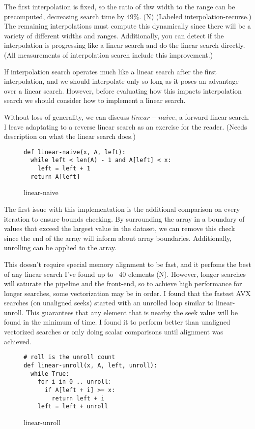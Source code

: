 \documentclass{article}
\begin{document}
The first interpolation is fixed, so the ratio of thw width to the range can be precomputed, decreasing search time by 49\%. (N) (Labeled interpolation-recurse.) The remaining interpolations must compute this dynamically since there will be a variety of different widths and ranges. Additionally, you can detect if the interpolation is progressing like a linear search and do the linear search directly. (All measurements of interpolation search include this improvement.)

If interpolation search operates much like a linear search after the first interpolation, and we should interpolate only so long as it poses an advantage over a linear search. However, before evaluating how this impacts interpolation search we should consider how to implement a linear search.

Without loss of generality, we can discuss $linear-naive$, a forward linear search. I leave adaptating to a reverse linear search as an exercise for the reader. (Needs description on what the linear search does.)

\begin{figure}
\begin{verbatim}
def linear-naive(x, A, left):
  while left < len(A) - 1 and A[left] < x:
    left = left + 1
  return A[left]
\end{verbatim}
\caption{linear-naive}
\end{figure}

 The first issue with this implementation is the additional comparison on every iteration to ensure bounds checking. By surrounding the array in a boundary of values that exceed the largest value in the dataset, we can remove this check since the end of the array will inform about array boundaries. Additionally, unrolling can be applied to the array.

This doesn't require special memory alignment to be fast, and it perfoms the best of any linear search I've found up to ~40 elements (N). However, longer searches will saturate the pipeline and the front-end, so to achieve high performance for longer searches, some vectorization may be in order. I found that the fastest AVX searches (on unaligned seeks) started with an unrolled loop similar to linear-unroll. This guarantees that any element that is nearby the seek value will be found in the minimum of time. I found it to perform better than unaligned vectorized searches or only doing scalar comparisons until alignment was achieved.

\begin{figure}
\begin{verbatim}
# roll is the unroll count
def linear-unroll(x, A, left, unroll):
  while True:
    for i in 0 .. unroll:
      if A[left + i] >= x:
        return left + i
    left = left + unroll
\end{verbatim}
\caption{linear-unroll}
\end{figure}
\end{document}
